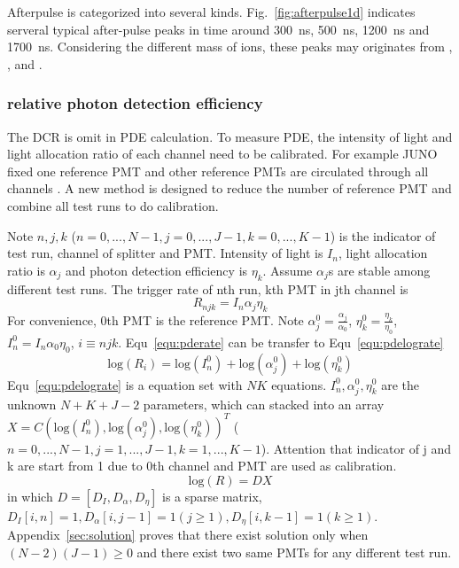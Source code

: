 Afterpulse is categorized into several kinds. Fig.~\ref{fig:afterpulse1d} indicates serveral typical after-pulse peaks in time around \SI{300}{ns},  \SI{500}{ns},  \SI{1200}{ns} and  \SI{1700}{ns}. Considering the different mass of ions, these peaks may originates from , ,  and .

\subsubsection{relative photon detection efficiency}
The DCR is omit in PDE calculation. To measure PDE, the intensity of light and light allocation ratio of each channel need to be calibrated. For example JUNO fixed one reference PMT and other reference PMTs are circulated through all channels \cite{Wonsak_2021}. A new method is designed to reduce the number of reference PMT and combine all test runs to do calibration.  

Note $n,j,k$ ($n=0,...,N-1, j=0,...,J-1, k=0,...,K-1$) is the indicator of test run, channel of splitter and PMT. Intensity of light is $I_n$, light allocation ratio is $\alpha_j$ and photon detection efficiency is $\eta_k$. Assume $\alpha_j$s are stable among different test runs. The trigger rate of nth run, kth PMT in jth channel is
\begin{equation}
    \label{equ:pderate}
    R_{njk}=I_n\alpha_j\eta_k
\end{equation}
For convenience, 0th PMT is the reference PMT. Note $\alpha_j^0=\frac{\alpha_j}{\alpha_0}$, $\eta_k^0=\frac{\eta_k}{\eta_0}$, $I_n^0=I_n\alpha_0\eta_0$, $i\equiv njk$. Equ~\eqref{equ:pderate} can be transfer to Equ~\eqref{equ:pdelograte}
\begin{equation}
    \label{equ:pdelograte}
    \mathrm{log}(R_{i})=\mathrm{log}(I_n^0)+\mathrm{log}(\alpha_j^0)+\mathrm{log}(\eta_k^0)
\end{equation}
Equ~\eqref{equ:pdelograte} is a equation set with $NK$ equations. $I_n^0,\alpha_j^0,\eta_k^0$ are the unknown $N+K+J-2$ parameters, which can stacked into an array $X = C(\mathrm{log}(I_n^0), \mathrm{log}(\alpha_j^0),\mathrm{log}(\eta_k^0))^T$ ($n=0,...,N-1, j=1,...,J-1, k=1,...,K-1$). Attention that indicator of j and k are start from 1 due to 0th channel and PMT are used as calibration. 
\begin{equation}
    \mathrm{log}(R)=DX
\end{equation}
in which $D=[D_I,D_\alpha, D_\eta]$ is a sparse matrix, $D_I[i,n]=1,D_\alpha[{i},j-1]=1(j\geq1), D_\eta[{i},k-1]=1(k\geq1)$. 
Appendix~\ref{sec:solution} proves that there exist solution only when $(N-2)(J-1)\geq0$ and there exist two same PMTs for any different test run.

